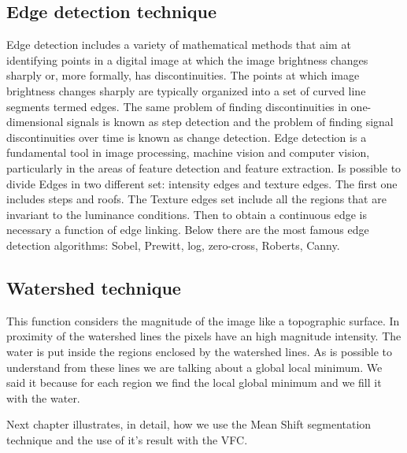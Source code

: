 \subsection{Edge detection technique}
Edge detection includes a variety of mathematical methods that aim at identifying points in a digital image at which the image brightness changes sharply or, more formally, has discontinuities. The points at which image brightness changes sharply are typically organized into a set of curved line segments termed edges. The same problem of finding discontinuities in one-dimensional signals is known as step detection and the problem of finding signal discontinuities over time is known as change detection. Edge detection is a fundamental tool in image processing, machine vision and computer vision, particularly in the areas of feature detection and feature extraction.\cite{edge} Is possible to divide Edges in two different set: intensity edges and texture edges. The first one includes steps and roofs. The Texture edges set include all the regions that are invariant to the luminance conditions. Then to obtain a continuous edge is necessary a function of edge linking. Below there are the most famous edge detection algorithms: Sobel, Prewitt, log, zero-cross, Roberts, Canny.

\subsection{Watershed technique}
This function considers the magnitude of the image like a topographic surface. In proximity of the watershed lines the pixels have an high magnitude intensity. The water is put inside the regions enclosed by the watershed lines. As is possible to understand from these lines we are talking about a global local minimum. We said it because for each region we find the local global minimum and we fill it with the water.

\bigskip

Next chapter illustrates, in detail, how we use the Mean Shift segmentation technique and the use of it's result with the VFC.